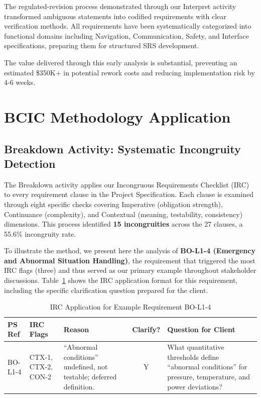 \documentclass[12pt,a4paper]{article}
\begin{document}
The regulated-revision process demonstrated through our Interpret activity transformed ambiguous statements into codified requirements with clear verification methods. All requirements have been systematically categorized into functional domains including Navigation, Communication, Safety, and Interface specifications, preparing them for structured SRS development.

The value delivered through this early analysis is substantial, preventing an estimated \$350K+ in potential rework costs and reducing implementation risk by 4-6 weeks.

\newpage
\section{BCIC Methodology Application}
\label{sec:bcic}

\subsection{Breakdown Activity: Systematic Incongruity Detection}

The Breakdown activity applies our Incongruous Requirements Checklist (IRC) to every requirement clause in the Project Specification. Each clause is examined through eight specific checks covering Imperative (obligation strength), Continuance (complexity), and Contextual (meaning, testability, consistency) dimensions. This process identified \textbf{15 incongruities} across the 27 clauses, a 55.6\% incongruity rate.

To illustrate the method, we present here the analysis of \textbf{BO-L1-4 (Emergency and Abnormal Situation Handling)}, the requirement that triggered the most IRC flags (three) and thus served as our primary example throughout stakeholder discussions. Table~\ref{tab:breakdown-example} shows the IRC application format for this requirement, including the specific clarification question prepared for the client.

\begin{table}[H]
\centering
\small
\renewcommand{\arraystretch}{1.3}
\caption{IRC Application for Example Requirement BO-L1-4}
\label{tab:breakdown-example}
\begin{tabular}{|>{\raggedright\arraybackslash}p{}|>{\raggedright\arraybackslash}p{}|>{\raggedright\arraybackslash}p{}|c|>{\raggedright\arraybackslash}p{}|}
\hline
\rowcolor{tableheader}
\textbf{PS Ref} & \textbf{IRC Flags} & \textbf{Reason} & \textbf{Clarify?} & \textbf{Question for Client} \\
\hline
BO-L1-4 & CTX-1, CTX-2, CON-2 & “Abnormal conditions” undefined, not testable; deferred definition. & Y & What quantitative thresholds define “abnormal conditions” for pressure, temperature, and power deviations? \\
\hline
\end{tabular}
\end{table}
\end{document}

